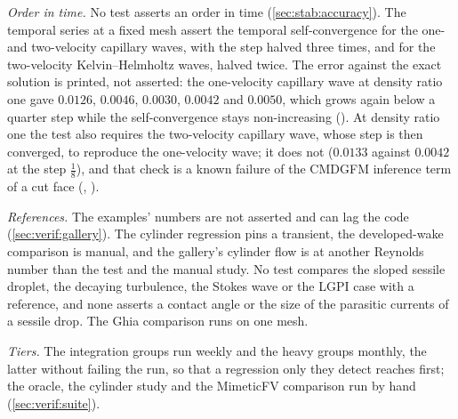 \emph{Order in time.} No test asserts an order in time
(\cref{sec:stab:accuracy}). The temporal series at a fixed mesh assert the
temporal self-convergence for the one- and two-velocity capillary waves, with
the step halved three times, and for the two-velocity Kelvin--Helmholtz
waves, halved twice. The error against the exact solution is printed, not
asserted: the one-velocity capillary wave at density ratio one gave $0.0126$,
$0.0046$, $0.0030$, $0.0042$ and $0.0050$, which grows again below a quarter
step while the self-convergence stays non-increasing (). At
density ratio one the test also requires the two-velocity capillary wave,
whose step is then converged, to reproduce the one-velocity wave; it does not
($0.0133$ against $0.0042$ at the step $\tfrac18$), and that check is a known
failure of the CMDGFM inference term of a cut face (,
).

\emph{References.} The examples' numbers are not asserted and can lag the
code (\cref{sec:verif:gallery}). The cylinder regression pins a transient,
the developed-wake comparison is manual, and the gallery's cylinder flow is
at another Reynolds number than the test and the manual study. No test
compares the sloped sessile droplet, the decaying turbulence, the Stokes wave
or the LGPI case with a reference, and none asserts a contact angle or the
size of the parasitic currents of a sessile drop. The Ghia comparison runs on
one mesh.

\emph{Tiers.} The integration groups run weekly and the heavy groups
monthly, the latter without failing the run, so that a regression only they
detect reaches  first; the oracle, the cylinder study and the
MimeticFV comparison run by hand (\cref{sec:verif:suite}).
